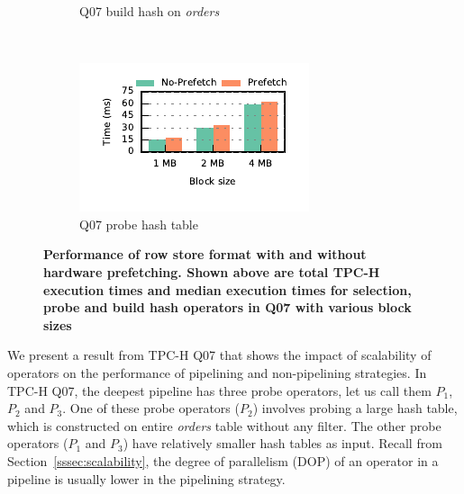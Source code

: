 \begin{figure}[t]
\begin{subfigure}[ht]{0.225\textwidth}
		\caption{Q07 build hash on \textit{orders}}
		\label{fig:prefetching-build-q07}
	\end{subfigure}
	~
	\begin{subfigure}[ht]{0.225\textwidth}
		\includegraphics[width=\textwidth]{pipeline/figures/prefetching-q07-probe-withlip-rowstore}
		\caption{Q07 probe hash table}
		\label{fig:prefetching-probe-q07}
	\end{subfigure}
	\caption{\textbf{Performance of row store format with and without hardware prefetching. Shown above are total TPC-H execution times and median \wo{} execution times for selection, probe and build hash operators in Q07 with various block sizes}}
	\label{fig:prefetching-vs-noprefetching-rowstore}
\end{figure}

We present a result from TPC-H Q07 that shows the impact of scalability of operators on the performance of pipelining and non-pipelining strategies.
In TPC-H Q07, the deepest pipeline has three probe operators, let us call them $P_1$, $P_2$ and $P_3$.
One of these probe operators ($P_2$) involves probing a large hash table, which is constructed on entire \textit{orders} table without any filter.
The other probe operators ($P_1$ and $P_3$) have relatively smaller hash tables as input. 
Recall from Section~\ref{sssec:scalability}, the degree of parallelism (DOP) of an operator in a pipeline is usually lower in the pipelining strategy. %

